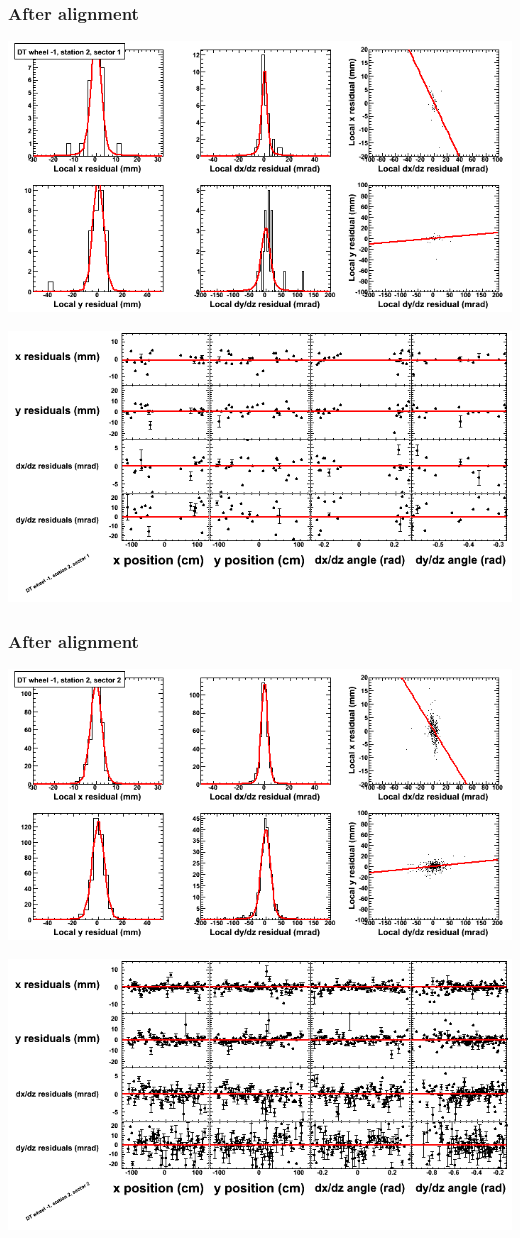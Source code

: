 \documentclass[compress]{beamer}
\begin{document}
\begin{frame}
\frametitle{After alignment}
\includegraphics[width=0.7\linewidth]{NOV4_fitfunctions/MBwhBst2sec01_bellcurves.png}

\includegraphics[width=0.7\linewidth]{NOV4_fitfunctions/MBwhBst2sec01_polynomials.png}
\end{frame}

\begin{frame}
\frametitle{After alignment}
\includegraphics[width=0.7\linewidth]{NOV4_fitfunctions/MBwhBst2sec02_bellcurves.png}

\includegraphics[width=0.7\linewidth]{NOV4_fitfunctions/MBwhBst2sec02_polynomials.png}
\end{frame}
\end{document}
